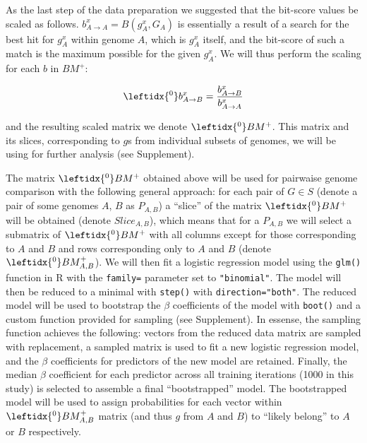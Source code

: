 As the last step of the data preparation we suggested that the bit-score values
be scaled as follows. $b_{A \rightarrow A}^x = B(g_A^x, G_A)$ is essentially a
result of a search for the best hit for $g_A^x$ within genome $A$, which is
$g_A^x$ itself, and the bit-score of such a match is the maximum possible for
the given $g_A^x$. We will thus perform the scaling for each $b$ in $BM^+$:

\begin{equation}
\leftidx{^0}b_{A \rightarrow B}^x = \dfrac{b_{A \rightarrow B}^x}{b_{A \rightarrow
A}^x}
\end{equation}

\newcommand{\bmzp}{\leftidx{^0}BM^+}

and the resulting scaled matrix we denote $\leftidx{^0}BM^+$. This matrix and
its slices, corresponding to $g$s from individual subsets of genomes, we will
be using for further analysis (see Supplement).

The matrix $\bmzp{}$ obtained above will be used for pairwaise genome
comparison with the following general approach:
for each pair of $G \in S$ (denote a pair of some genomes $A$, $B$ as
$P_{A,B}$) a ``slice'' of the matrix $\bmzp{}$
will be obtained (denote $Slice_{A,B}$), which means that for a $P_{A,B}$ we
will select a submatrix of $\bmzp{}$ with all columns except for those
corresponding to $A$ and $B$ and rows corresponding only to $A$ and $B$ (denote
$\leftidx{^0}BM_{A,B}^+$).
\newcommand{\bmzpab}{\leftidx{^0}BM_{A,B}^+}
We will then fit a logistic regression model using the {\tt glm{()}} function
in R with the {\tt family=} parameter set to {\tt "binomial"}. The model will
then be reduced to a minimal with {\tt step()} with {\tt direction="both"}. The
reduced model will be used to bootstrap the $\beta$ coefficients of the model
with {\tt boot()} and a custom function provided for sampling (see Supplement).
In essense, the sampling function achieves the following: vectors from the
reduced data matrix are sampled with replacement, a sampled matrix is used to
fit a new logistic regression model, and the $\beta$ coefficients for
predictors of the new model are retained. Finally, the median $\beta$
coefficient for each predictor across all training iterations (1000 in this
study) is selected to assemble a final ``bootstrapped''
model. The bootstrapped model will be used to assign probabilities for each
vector within $\bmzpab$ matrix (and thus $g$ from $A$ and $B$) to ``likely
belong'' to $A$ or $B$ respectively.

